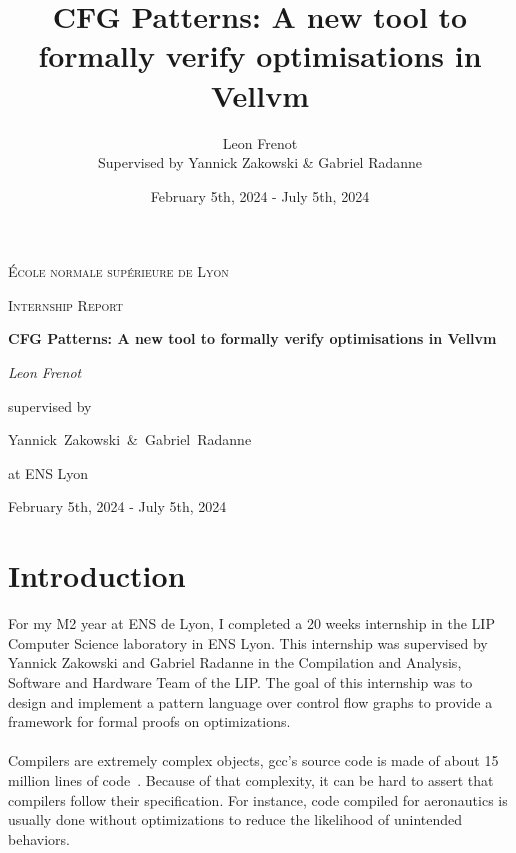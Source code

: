 \documentclass[11pt]{article}
\newcommand{\leon}[1]{\textcolor{blue}{#1}}
\begin{document}
\title{CFG Patterns: A new tool to formally verify optimisations in Vellvm}

\author{Leon Frenot\\ Supervised by Yannick Zakowski \& Gabriel Radanne}

\date{February 5th, 2024 - July 5th, 2024}

\begin{titlepage}
  \centering
  {\textsc{École normale supérieure de Lyon} \par}
  \vspace{1cm}
  {\Large \textsc{Internship Report}\par}
  \vspace{1.5cm}
  {\huge\bfseries CFG Patterns: A new tool to formally verify optimisations in Vellvm\par}
  \vspace{2cm}
  {\Large\itshape Leon Frenot\par}
  \vfill
  supervised by\par
  Yannick~Zakowski~\&~Gabriel~Radanne\par
  at ENS Lyon
  \vfill

  {\large February 5th, 2024 - July 5th, 2024\par}
\end{titlepage}

\tableofcontents
\newpage

\hypersetup{colorlinks=true, linkcolor=red}


\section{Introduction}
\label{sec:intro}

\indent
For my M2 year at ENS de Lyon, I completed a 20 weeks internship in the LIP Computer Science laboratory in ENS Lyon. This internship was supervised by Yannick Zakowski and Gabriel Radanne in the Compilation and Analysis, Software and Hardware Team of the LIP. The goal of this internship was to design and implement a pattern language over control flow graphs to provide a framework for formal proofs on optimizations.

\paragraph{}
Compilers are extremely complex objects, gcc's source code is made of about 15 million lines of code~\cite{GCC}. Because of that complexity, it can be hard to assert that compilers follow their specification. For instance, code compiled for aeronautics is usually done without optimizations to reduce the likelihood of unintended behaviors.
\end{document}
